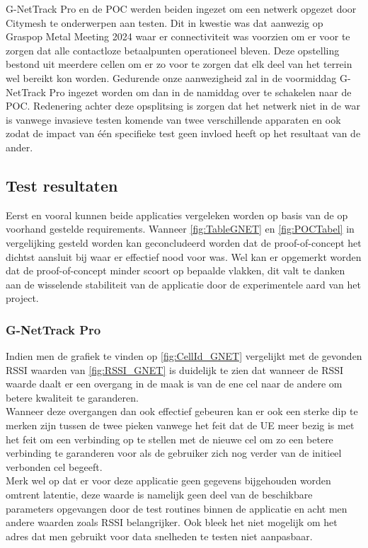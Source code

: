 G-NetTrack Pro en de POC werden beiden ingezet om een netwerk opgezet door Citymesh te onderwerpen aan testen. Dit in kwestie was dat aanwezig op Graspop Metal Meeting 2024 waar er connectiviteit was voorzien om er voor te zorgen dat alle contactloze betaalpunten operationeel bleven. Deze opstelling bestond uit meerdere cellen om er zo voor te zorgen dat elk deel van het terrein wel bereikt kon worden. Gedurende onze aanwezigheid zal in de voormiddag G-NetTrack Pro ingezet worden om dan in de namiddag over te schakelen naar de POC. Redenering achter deze opsplitsing is zorgen dat het netwerk niet in de war is vanwege invasieve testen komende van twee verschillende apparaten en ook zodat de impact van één specifieke test geen invloed heeft op het resultaat van de ander.

\subsection{Test resultaten}

Eerst en vooral kunnen beide applicaties vergeleken worden op basis van de op voorhand gestelde requirements. Wanneer \ref{fig:TableGNET} en \ref{fig:POCTabel} in vergelijking gesteld worden kan geconcludeerd worden dat de proof-of-concept het dichtst aansluit bij waar er effectief nood voor was. Wel kan er opgemerkt worden dat de proof-of-concept minder scoort op bepaalde vlakken, dit valt te danken aan de wisselende stabiliteit van de applicatie door de experimentele aard van het project.

\subsubsection{G-NetTrack Pro}

Indien men de grafiek te vinden op \ref{fig:CellId_GNET} vergelijkt met de gevonden RSSI waarden van \ref{fig:RSSI_GNET} is duidelijk te zien dat wanneer de RSSI waarde daalt er een overgang in de maak is van de ene cel naar de andere om betere kwaliteit te garanderen. \\

Wanneer deze overgangen dan ook effectief gebeuren kan er ook een sterke dip te merken zijn tussen de twee pieken vanwege het feit dat de UE meer bezig is met het feit om een verbinding op te stellen met de nieuwe cel om zo een betere verbinding te garanderen voor als de gebruiker zich nog verder van de initieel verbonden cel begeeft. \\

Merk wel op dat er voor deze applicatie geen gegevens bijgehouden worden omtrent latentie, deze waarde is namelijk geen deel van de beschikbare parameters opgevangen door de test routines binnen de applicatie en acht men andere waarden zoals RSSI belangrijker. Ook bleek het niet mogelijk om het adres dat men gebruikt voor data snelheden te testen niet aanpasbaar. 

